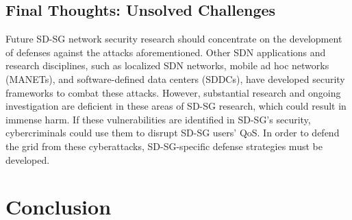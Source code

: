 \documentclass[conference]{IEEEtran}
\begin{document}
\subsection{Final Thoughts: Unsolved Challenges}
Future SD-SG network security research should concentrate on the development of defenses against the attacks aforementioned. Other SDN applications and research disciplines, such as localized SDN networks, mobile ad hoc networks (MANETs), and software-defined data centers (SDDCs), have developed security frameworks to combat these attacks. However, substantial research and ongoing investigation are deficient in these areas of SD-SG research, which could result in immense harm. If these vulnerabilities are identified in SD-SG's security, cybercriminals could use them to disrupt SD-SG users' QoS. In order to defend the grid from these cyberattacks, SD-SG-specific defense strategies must be developed.






\section{Conclusion}  
\label{conclusion}
\end{document}
